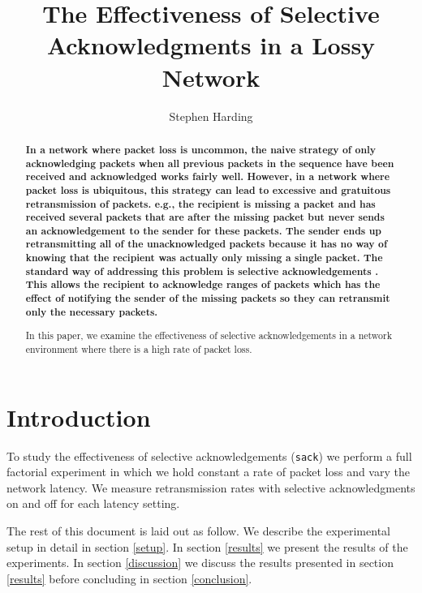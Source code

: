 \documentclass[]{article}
\begin{document}
\title{The Effectiveness of Selective Acknowledgments in a Lossy Network}
\author{Stephen Harding}

\maketitle

\begin{abstract}\bf\normalsize
In a network where packet loss is uncommon, the naive strategy of only
acknowledging packets when all previous packets in the sequence have been
received and acknowledged works fairly well. However, in a network 
where packet loss is ubiquitous, this strategy can lead to excessive and
gratuitous retransmission of packets. e.g., the recipient is missing a packet
and has received several packets that are after the missing packet but never
sends an acknowledgement to the sender for these packets. The sender ends up
retransmitting all of the unacknowledged packets because it has no way of knowing
that the recipient was actually only missing a single packet. The standard way
of addressing this problem is selective acknowledgements \cite{floyd1996tcp} 
\cite{floyd2000extension}. This  allows the recipient to acknowledge ranges of 
packets which has the effect of notifying the sender of the missing packets so 
they can retransmit only the necessary packets.

In this paper, we examine the effectiveness of selective acknowledgements in
a network environment where there is a high rate of packet loss. 
\end{abstract}\normalfont

\section{Introduction}
To study the effectiveness of selective acknowledgements (\texttt{sack}) we perform a 
full factorial experiment in which we hold constant a rate of packet loss and
vary the network latency. We measure retransmission rates with selective
acknowledgments on and off for each latency setting.

The rest of this document is laid out as follow. We describe the experimental 
setup in detail in section \ref{setup}. In section \ref{results} we present
the results of the experiments. In section \ref{discussion} we discuss the
results presented in section \ref{results} before concluding in section
\ref{conclusion}.
\end{document}
